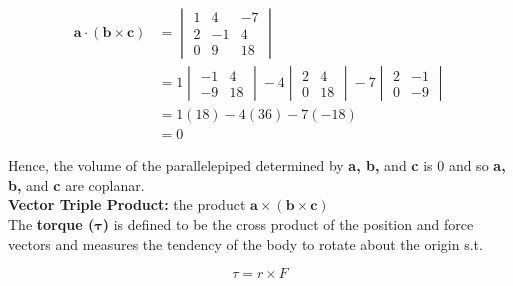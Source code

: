         \begin{align*}
            \mathbf{a\cdot (b\times c)} &= \begin{vmatrix}
                                               1 & 4 & -7 \\
                                               2 & -1 & 4 \\
                                               0 & 9 & 18
                                           \end{vmatrix} \\
                                        &= 1\begin{vmatrix}
                                                -1 & 4 \\
                                                -9 & 18
                                            \end{vmatrix} - 4
                                            \begin{vmatrix}
                                                2 & 4 \\
                                                0 & 18
                                            \end{vmatrix} - 7
                                            \begin{vmatrix}
                                                2 & -1 \\
                                                0 & -9
                                            \end{vmatrix} \\
                                        &= 1(18) - 4(36) - 7(-18) \\
                                        &= 0
        \end{align*}

        Hence, the volume of the parallelepiped determined by \textbf{a, b,} and \textbf{c} is 0 and so \textbf{a, b,} and \textbf{c} are coplanar. \\

        \textbf{Vector Triple Product:} the product $\mathbf{a\times (b\times c)}$ \\

        The \textbf{torque ($\mathbf{\tau}$)} is defined to be the cross product of the position and force vectors and measures the tendency of the body to rotate about the origin s.t.

        \[
            \tau = r \times F
        \]

